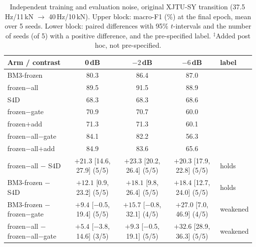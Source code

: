 \begin{table}[htbp]
\centering
\caption{Independent training and evaluation noise, original XJTU-SY transition (37.5\,Hz/11\,kN $\rightarrow$ 40\,Hz/10\,kN). Upper block: macro-F1 (\%) at the final epoch, mean over 5 seeds. Lower block: paired differences with 95\% $t$-intervals and the number of seeds (of 5) with a positive difference, and the pre-specified label. $^{\ddagger}$Added post hoc, not pre-specified.}
\label{tab:indep}
\scriptsize\setlength{\tabcolsep}{3pt}
\begin{tabular}{@{}lcccl@{}}
\toprule
Arm / contrast & 0\,dB & $-2$\,dB & $-6$\,dB & label \\
\midrule
BM3-frozen & 80.3 & 86.4 & 87.0 \\
frozen$-$all & 89.5 & 91.5 & 88.9 \\
S4D & 68.3 & 68.3 & 68.6 \\
frozen$-$gate & 70.9 & 70.7 & 60.0 \\
frozen$+$add & 71.3 & 71.3 & 60.1 \\
frozen$-$all$-$gate & 84.1 & 82.2 & 56.3 \\
frozen$-$all$+$add & 84.9 & 83.6 & 65.6 \\
\midrule
\shortstack[l]{frozen$-$all\\ $-$ S4D} & \shortstack{$+21.3$\\ {[}14.6, 27.9{]} (5/5)} & \shortstack{$+23.3$\\ {[}20.2, 26.4{]} (5/5)} & \shortstack{$+20.3$\\ {[}17.9, 22.8{]} (5/5)} & holds \\[3pt]
\shortstack[l]{BM3-frozen\\ $-$ S4D} & \shortstack{$+12.1$\\ {[}0.9, 23.2{]} (5/5)} & \shortstack{$+18.1$\\ {[}9.8, 26.4{]} (5/5)} & \shortstack{$+18.4$\\ {[}12.7, 24.0{]} (5/5)} & holds \\[3pt]
\shortstack[l]{BM3-frozen\\ $-$ frozen$-$gate} & \shortstack{$+9.4$\\ {[}$-$0.5, 19.4{]} (5/5)} & \shortstack{$+15.7$\\ {[}$-$0.8, 32.1{]} (4/5)} & \shortstack{$+27.0$\\ {[}7.0, 46.9{]} (4/5)} & weakened \\[3pt]
\shortstack[l]{frozen$-$all\\ $-$ frozen$-$all$-$gate} & \shortstack{$+5.4$\\ {[}$-$3.8, 14.6{]} (3/5)} & \shortstack{$+9.3$\\ {[}$-$0.5, 19.1{]} (5/5)} & \shortstack{$+32.6$\\ {[}28.9, 36.3{]} (5/5)} & weakened \\[3pt]

\end{tabular}
\end{table}
